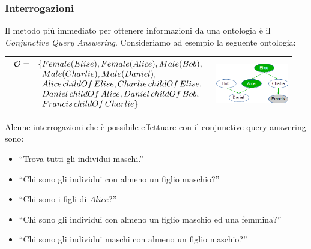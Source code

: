 \documentclass[8pt]{beamer}
\begin{document}
\begin{frame}
\frametitle{Interrogazioni}

Il metodo pi\`u immediato per ottenere informazioni da una ontologia \`e il 
\emph{Conjunctive Query Answering}. Consideriamo ad esempio la seguente ontologia:

\begin{tabular}{cc}
\hline
$\begin{array}{cl}
  \Ont  =  &  \{Female(Elise), Female(Alice), Male(Bob), \\
  &\phantom{\{}Male(Charlie), Male(Daniel), \\
  &\phantom{\{}Alice\,childOf\,Elise, Charlie\,childOf\,Elise, \\
  &\phantom{\{}Daniel\,childOf\,Alice, Daniel\,childOf\,Bob, \\
  &\phantom{\{}Francis\,childOf\,Charlie \}
 \end{array}$ & \includegraphics[width=120px]{family.png} \\
\hline
\end{tabular}

Alcune interrogazioni che \`e possibile effettuare con il conjunctive query 
answering sono:
\begin{itemize}
 \item ``Trova tutti gli individui maschi.''
 \item ``Chi sono gli individui con almeno un figlio maschio?''
 \item ``Chi sono i figli di $Alice$?''
 \item ``Chi sono gli individui con almeno un figlio maschio ed una femmina?''
 \item ``Chi sono gli individui maschi con almeno un figlio maschio?''
\end{itemize}
\end{frame}
\end{document}
